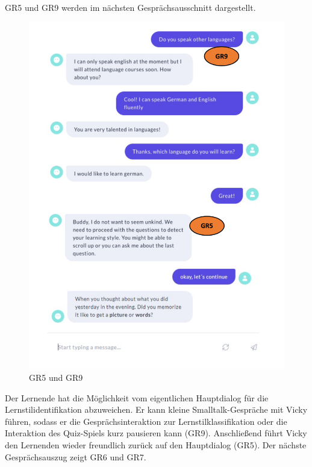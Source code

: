 GR5 und GR9 werden im nächsten Gesprächsausschnitt dargestellt.
\begin{figure}[H]
  \centering
  \includegraphics[width=0.7\linewidth]{images/GR5_GR9.png}

  \caption[GR5 und GR9]{GR5 und GR9}
  \label{fig:GR5_GR9}
\end{figure} 
Der Lernende hat die Möglichkeit vom eigentlichen Hauptdialog 
für die Lernstilidentifikation abzuweichen. Er kann kleine Smalltalk-Gespräche mit Vicky führen, sodass er die Gesprächsinteraktion
zur Lernstilklassifikation oder die Interaktion des Quiz-Spiels 
kurz pausieren kann (GR9).
Anschließend führt Vicky den Lernenden wieder freundlich zurück 
auf den Hauptdialog (GR5). Der nächste Gesprächsauszug zeigt GR6 und GR7. 

